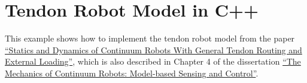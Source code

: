 \documentclass[12pt]{article}
\begin{document}
\makeatletter
\renewcommand{\@maketitle}{
\newpage
\null
\vskip 2em
\begin{center}
{\LARGE \@title \par}
\end{center}
\par
} \makeatother

\maketitle

\section{Tendon Robot Model in C++}

This example shows how to implement the tendon robot model from the paper \href{https://ieeexplore.ieee.org/document/5957337}{``Statics and Dynamics of Continuum Robots With General Tendon Routing and External Loading''}, which is also described in Chapter 4 of the dissertation \href{https://etd.library.vanderbilt.edu//available/etd-10042011-115347/}{``The Mechanics of Continuum Robots: Model-based Sensing and Control''}.
\end{document}
